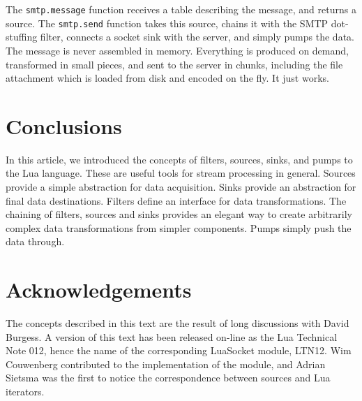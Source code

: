 \documentclass[10pt]{article}
\begin{document}
			The \texttt{smtp.message} function receives a table
			describing the message, and returns a source. The
			\texttt{smtp.send} function takes this source, chains it with the
			SMTP dot-stuffing filter, connects a socket sink
			with the server, and simply pumps the data. The message is never 
			assembled in memory.  Everything is produced on demand, 
			transformed in small pieces, and sent to the server in chunks, 
			including the file attachment which is loaded from disk and 
			encoded on the fly. It just works.
			
			\section{Conclusions}
			
			In this article, we introduced the concepts of filters,
			sources, sinks, and pumps to the Lua language. These are
			useful tools for stream processing in general. Sources provide
			a simple abstraction for data acquisition. Sinks provide an
			abstraction for final data destinations. Filters define an
			interface for data transformations.  The chaining of
			filters, sources and sinks provides an elegant way to create
			arbitrarily complex data transformations from simpler
			components. Pumps simply push the data through.  
			
			\section{Acknowledgements}
			
			The concepts described in this text are the result of  long
			discussions with David Burgess. A version of this text has
			been released on-line as the Lua Technical Note 012, hence
			the name of the corresponding LuaSocket module, LTN12.  Wim
			Couwenberg contributed to the implementation of the module,
			and Adrian Sietsma was the first to notice the
			correspondence between sources and Lua iterators. 
			
			
			
\end{document}

